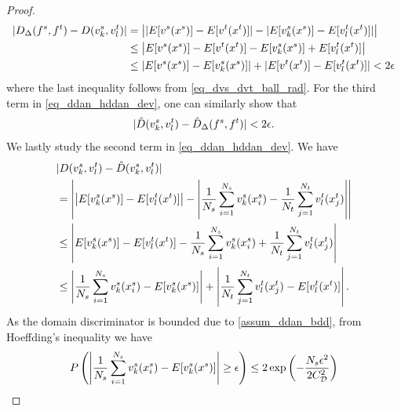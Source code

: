 \documentclass[review,supplement,onefignum,onetabnum]{siamonline250211}
\begin{document}
\begin{proof}
%
\begin{equation}
\label{eq_ddan_hddan_term1}
\begin{split}
 | D_{\Delta}(f^s, f^t)  - D(v^s_k, v^t_l) |
&=
\left | 
|  E[v^s(x^s) ]  - E [v^t(x^t) ]   |
- 
|  E[v^s_k(x^s)] - E[v^t_l(x^t)] | 
\right |  \\
&\leq
\left | 
 E[v^s(x^s) ]  - E [v^t(x^t) ]   
- 
  E[v^s_k(x^s)] + E[v^t_l(x^t)] 
\right |  \\
&\leq
| E[v^s(x^s) ] -   E[v^s_k(x^s)] |
+
|  E [v^t(x^t)] - E[v^t_l(x^t)] |
<
2\epsilon
\end{split}
\end{equation}
%
where the last inequality follows from \eqref{eq_dvs_dvt_ball_rad}. For the third term in \eqref{eq_ddan_hddan_dev}, one can similarly show that 
%
\begin{equation}
\label{eq_ddan_hddan_term3}
\begin{split}
| \hat{D}(v^s_k, v^t_l) 
- \hat{D}_{\Delta}(f^s, f^t) |  < 2 \epsilon.
\end{split}
\end{equation}
%
We lastly study the second term in \eqref{eq_ddan_hddan_dev}. We have
%
\begin{equation}
\label{eq_ddan_hddan_bnd1}
\begin{split}
&
| D(v^s_k, v^t_l)  
- \hat{D}(v^s_k, v^t_l)  | \\
&=
\left |
\left |  E[v^s_k(x^s)] - E[v^t_l(x^t)] \right | 
- 
\left | 
 \frac{1}{N_s} 
  \sum_{i=1}^{N_s} v^s_k (x^s_i)
  - 
  \frac{1}{N_t} 
  \sum_{j=1}^{N_t} v^t_l (x^t_j) 
  \right | 
  \right | \\
& \leq
\left |
 E[v^s_k(x^s)] - E[v^t_l(x^t)] 
- 
 \frac{1}{N_s} 
  \sum_{i=1}^{N_s} v^s_k (x^s_i)
  +
  \frac{1}{N_t} 
  \sum_{j=1}^{N_t} v^t_l (x^t_j) 
\right | \\
&\leq
\left | 
 \frac{1}{N_s}   \sum_{i=1}^{N_s} v^s_k (x^s_i) -  E[v^s_k(x^s)]
 \right |
+
\left | 
  \frac{1}{N_t}  \sum_{j=1}^{N_t} v^t_l (x^t_j)  - E[v^t_l(x^t)] 
\right |.
\end{split}
\end{equation}
%
As the domain discriminator is bounded due to \cref{assum_ddan_bdd}, from Hoeffding's inequality we have
%
\begin{equation*}
\begin{split}
P \left( 
\left |
\frac{1}{N_s} 
  \sum_{i=1}^{N_s} v^s_k (x^s_i)
 - E[v^s_k(x^s)]
\right |
\geq \epsilon
\right)
\leq
2 \exp \left(
-\frac{N_s \epsilon^2}{2 {C^2_{\mathcal{D}}}}
\right)
\end{split}
\end{equation*}

\end{proof}
\end{document}
